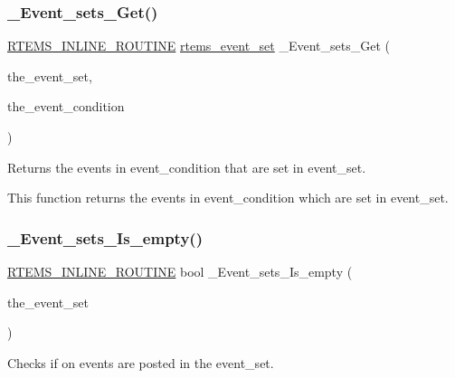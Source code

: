 \subsubsection{\texorpdfstring{\_Event\_sets\_Get()}{\_Event\_sets\_Get()}}
{\footnotesize\ttfamily \mbox{\hyperlink{group__RTEMSScoreBaseDefs_gac216239df231d5dbd15e3520b0b9313f}{R\+T\+E\+M\+S\+\_\+\+I\+N\+L\+I\+N\+E\+\_\+\+R\+O\+U\+T\+I\+NE}} \mbox{\hyperlink{group__ClassicEventSet_gab7b8f373bea85fd4e3b7ae23905faa07}{rtems\+\_\+event\+\_\+set}} \+\_\+\+Event\+\_\+sets\+\_\+\+Get (\begin{DoxyParamCaption}\item[{\mbox{\hyperlink{group__ClassicEventSet_gab7b8f373bea85fd4e3b7ae23905faa07}{rtems\+\_\+event\+\_\+set}}}]{the\+\_\+event\+\_\+set,  }\item[{\mbox{\hyperlink{group__ClassicEventSet_gab7b8f373bea85fd4e3b7ae23905faa07}{rtems\+\_\+event\+\_\+set}}}]{the\+\_\+event\+\_\+condition }\end{DoxyParamCaption})}



Returns the events in event\+\_\+condition that are set in event\+\_\+set. 

This function returns the events in event\+\_\+condition which are set in event\+\_\+set. \mbox{\label{group__ClassicEventImpl_gad7150e351d71bedd3ac0033aca933e4b}} 
\subsubsection{\texorpdfstring{\_Event\_sets\_Is\_empty()}{\_Event\_sets\_Is\_empty()}}
{\footnotesize\ttfamily \mbox{\hyperlink{group__RTEMSScoreBaseDefs_gac216239df231d5dbd15e3520b0b9313f}{R\+T\+E\+M\+S\+\_\+\+I\+N\+L\+I\+N\+E\+\_\+\+R\+O\+U\+T\+I\+NE}} bool \+\_\+\+Event\+\_\+sets\+\_\+\+Is\+\_\+empty (\begin{DoxyParamCaption}\item[{\mbox{\hyperlink{group__ClassicEventSet_gab7b8f373bea85fd4e3b7ae23905faa07}{rtems\+\_\+event\+\_\+set}}}]{the\+\_\+event\+\_\+set }\end{DoxyParamCaption})}



Checks if on events are posted in the event\+\_\+set. 

